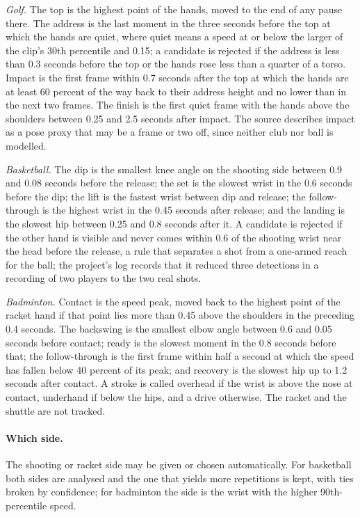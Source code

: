\documentclass[sigconf,nonacm]{acmart}
\begin{document}
\emph{Golf.} The top is the highest point of the hands, moved to the end of any pause there.
The address is the last moment in the three seconds before the top at which the hands are
quiet, where quiet means a speed at or below the larger of the clip's 30th percentile and 0.15;
a candidate is rejected if the address is less than 0.3 seconds before the top or the hands
rose less than a quarter of a torso. Impact is the first frame within 0.7 seconds after the top
at which the hands are at least 60 percent of the way back to their address height and no
lower than in the next two frames. The finish is the first quiet frame with the hands above
the shoulders between 0.25 and 2.5 seconds after impact. The source describes impact as a pose
proxy that may be a frame or two off, since neither club nor ball is modelled.

\emph{Basketball.} The dip is the smallest knee angle on the shooting side between 0.9 and
0.08 seconds before the release; the set is the slowest wrist in the 0.6 seconds before the
dip; the lift is the fastest wrist between dip and release; the follow-through is the highest
wrist in the 0.45 seconds after release; and the landing is the slowest hip between 0.25 and
0.8 seconds after it. A candidate is rejected if the other hand is visible and never comes
within 0.6 of the shooting wrist near the head before the release, a rule that separates a
shot from a one-armed reach for the ball; the project's log records that it reduced three
detections in a recording of two players to the two real shots.

\emph{Badminton.} Contact is the speed peak, moved back to the highest point of the racket
hand if that point lies more than 0.45 above the shoulders in the preceding 0.4 seconds. The
backswing is the smallest elbow angle between 0.6 and 0.05 seconds before contact; ready is
the slowest moment in the 0.8 seconds before that; the follow-through is the first frame
within half a second at which the speed has fallen below 40 percent of its peak; and recovery
is the slowest hip up to 1.2 seconds after contact. A stroke is called overhead if the wrist
is above the nose at contact, underhand if below the hips, and a drive otherwise. The racket
and the shuttle are not tracked.

\paragraph{Which side.}
The shooting or racket side may be given or chosen automatically. For basketball both sides
are analysed and the one that yields more repetitions is kept, with ties broken by confidence;
for badminton the side is the wrist with the higher 90th-percentile speed.
\end{document}
